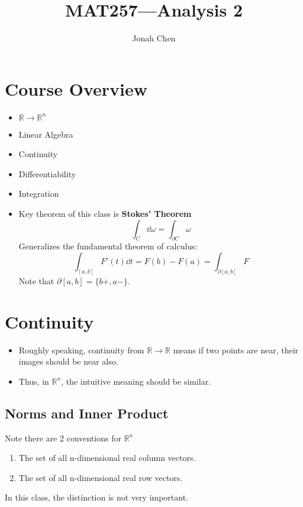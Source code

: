 \documentclass[a4paper]{article}
\title{MAT257---Analysis 2}
\author{Jonah Chen}
\numberwithin{equation}{section}
\begin{document}
\sffamily
\maketitle
\tableofcontents
\section{Course Overview}
\begin{itemize}
    \item $\mathbb R\to\mathbb R^n$
    \item Linear Algebra
    \item Continuity
    \item Differentiability
    \item Integration
    \item Key theorem of this class is \textbf{Stokes' Theorem}
    \begin{equation}
        \int_C\dd\omega=\int_{\partial C}\omega
    \end{equation}
    Generalizes the fundamental theorem of calculus:
    \begin{equation}
        \int_{[a,b]}F'(t)\dd t=F(b)-F(a)=\int_{\partial[a,b]}F
    \end{equation}
    Note that $\partial[a,b]=\{b+, a-\}$.
\end{itemize}

\section{Continuity}
\begin{itemize}
    \item Roughly speaking, continuity from $\mathbb R\to\mathbb R$ means if two points are near, their images should be near also.
    \item Thus, in $\mathbb R^n$, the intuitive meaning should be similar.
\end{itemize}
\subsection{Norms and Inner Product}
Note there are 2 conventions for $\mathbb R^n$
\begin{enumerate}
    \item The set of all n-dimensional real column vectors.
    \item The set of all n-dimensional real row vectors.
\end{enumerate}
In this class, the distinction is not very important.
\end{document}
